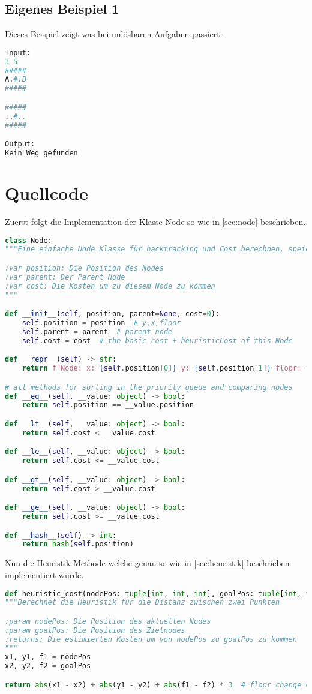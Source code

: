 \documentclass[a4paper,10pt,ngerman]{scrartcl}
\begin{document}
\subsection{Eigenes Beispiel 1} Dieses Beispiel zeigt was bei unlösbaren Aufgaben passiert.
\begin{lstlisting}[language=Python]
Input:
3 5
#####
A.#.B
#####

#####
..#..
#####

Output:
Kein Weg gefunden
\end{lstlisting}

\section{Quellcode}
Zuerst folgt die Implementation der Klasse Node so wie in \cref{sec:node} beschrieben.
\begin{lstlisting}[language=Python]
class Node:
"""Eine einfache Node Klasse für backtracking und Cost berechnen, speichert auch die Position

:var position: Die Position des Nodes
:var parent: Der Parent Node
:var cost: Die Kosten um zu diesem Node zu kommen
"""

def __init__(self, position, parent=None, cost=0):
    self.position = position  # y,x,floor
    self.parent = parent  # parent node
    self.cost = cost  # the basic cost + heuristicCost of this Node

def __repr__(self) -> str:
    return f"Node: x: {self.position[0]} y: {self.position[1]} floor: {self.position[2]} cost: {self.cost}"

# all methods for sorting in the priority queue and comparing nodes
def __eq__(self, __value: object) -> bool:
    return self.position == __value.position

def __lt__(self, __value: object) -> bool:
    return self.cost < __value.cost

def __le__(self, __value: object) -> bool:
    return self.cost <= __value.cost

def __gt__(self, __value: object) -> bool:
    return self.cost > __value.cost

def __ge__(self, __value: object) -> bool:
    return self.cost >= __value.cost

def __hash__(self) -> int:
    return hash(self.position)
\end{lstlisting}
Nun die Heuristik Methode welche genau so wie in \cref{sec:heuristik} beschrieben implementiert wurde.
\begin{lstlisting}[language=Python]
def heuristic_cost(nodePos: tuple[int, int, int], goalPos: tuple[int, int, int]) -> int:
"""Berechnet die Heuristik für die Distanz zwischen zwei Punkten

:param nodePos: Die Position des aktuellen Nodes
:param goalPos: Die Position des Zielnodes
:returns: Die estimierten Kosten um von nodePos zu goalPos zu kommen
"""
x1, y1, f1 = nodePos
x2, y2, f2 = goalPos

return abs(x1 - x2) + abs(y1 - y2) + abs(f1 - f2) * 3  # floor change cost is 3
\end{lstlisting}
\end{document}
